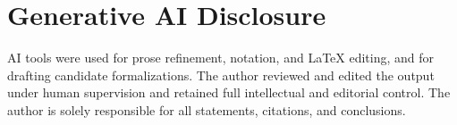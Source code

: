 \section*{Generative AI Disclosure}

AI tools were used for prose refinement, notation, and \LaTeX{} editing, and for drafting candidate formalizations. The author reviewed and edited the output under human supervision and retained full intellectual and editorial control. The author is solely responsible for all statements, citations, and conclusions.
